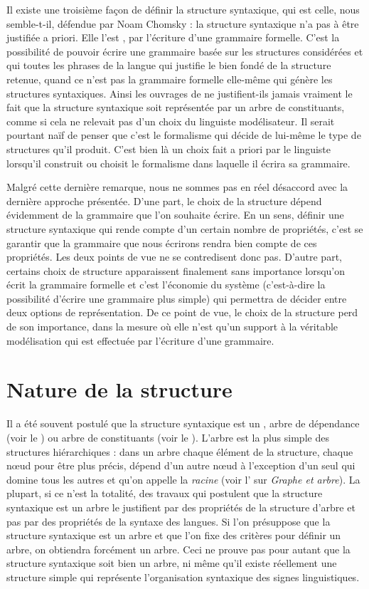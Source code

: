 {    Il existe une troisième façon de définir la structure syntaxique, qui est celle, nous semble-t-il, défendue par Noam Chomsky : la structure syntaxique n’a pas à être justifiée a priori. Elle l’est , par l’écriture d’une grammaire formelle. C’est la possibilité de pouvoir écrire une grammaire basée sur les structures considérées et qui  toutes les phrases de la langue qui justifie le bien fondé de la structure retenue, quand ce n’est pas la grammaire formelle elle-même qui génère les structures syntaxiques. Ainsi les ouvrages de  ne justifient-ils jamais vraiment le fait que la structure syntaxique soit représentée par un arbre de constituants, comme si cela ne relevait pas d’un choix du linguiste modélisateur. Il serait pourtant naïf de penser que c’est le formalisme qui décide de lui-même le type de structures qu’il produit. C’est bien là un choix fait a priori par le linguiste lorsqu’il construit ou choisit le formalisme dans laquelle il écrira sa grammaire.

    Malgré cette dernière remarque, nous ne sommes pas en réel désaccord avec la dernière approche présentée. D’une part, le choix de la structure dépend évidemment de la grammaire que l’on souhaite écrire. En un sens, définir une structure syntaxique qui rende compte d’un certain nombre de propriétés, c’est se garantir que la grammaire que nous écrirons rendra bien compte de ces propriétés. Les deux points de vue ne se contredisent donc pas. D’autre part, certains choix de structure apparaissent finalement sans importance lorsqu’on écrit la grammaire formelle et c’est l’économie du système (c’est-à-dire la possibilité d’écrire une grammaire plus simple) qui permettra de décider entre deux options de représentation. De ce point de vue, le choix de la structure perd de son importance, dans la mesure où elle n’est qu’un support à la véritable modélisation qui est effectuée par l’écriture d’une grammaire.
}
\section{Nature de la structure}\label{sec:3.2.4}

Il a été souvent postulé que la structure syntaxique est un , arbre de dépendance (voir le ) ou arbre de constituants (voir le ). L’arbre est la plus simple des structures hiérarchiques : dans un arbre chaque élément de la structure, chaque nœud pour être plus précis, dépend d’un autre nœud à l’exception d’un seul qui domine tous les autres et qu’on appelle la \textit{racine} (voir l' sur \textit{Graphe et arbre}). La plupart, si ce n’est la totalité, des travaux qui postulent que la structure syntaxique est un arbre le justifient par des propriétés de la structure d’arbre et pas par des propriétés de la syntaxe des langues. Si l’on présuppose que la structure syntaxique est un arbre et que l’on fixe des critères pour définir un arbre, on obtiendra forcément un arbre. Ceci ne prouve pas pour autant que la structure syntaxique soit bien un arbre, ni même qu’il existe réellement une structure simple qui représente l’organisation syntaxique des signes linguistiques.

